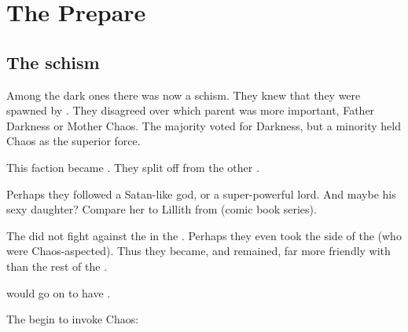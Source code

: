 \section{The \Resphain{} Prepare}
\subsection{The \Baelzerach{} schism}
Among the dark ones there was now a schism. They knew that they were spawned by . They disagreed over which parent was more important, Father Darkness or Mother Chaos. The majority voted for Darkness, but a minority held Chaos as the superior force. 

This faction became \Baelzerach. They split off from the other \resphain. 

Perhaps they followed a Satan-like god, or a super-powerful \resphan{} lord. And maybe his sexy daughter? Compare her to Lillith from  (comic book series). 

The \Baelzerach{} did not fight against the \dragons{} in the \secondbanewar{}. Perhaps they even took the side of the \dragons{} (who were Chaos-aspected). Thus they became, and remained, far more friendly with \dragons{} than the rest of the \resphain. 

\Ishnaruchaefir{} would go on to have . 


The \Baelzerach{} begin to invoke Chaos: 








